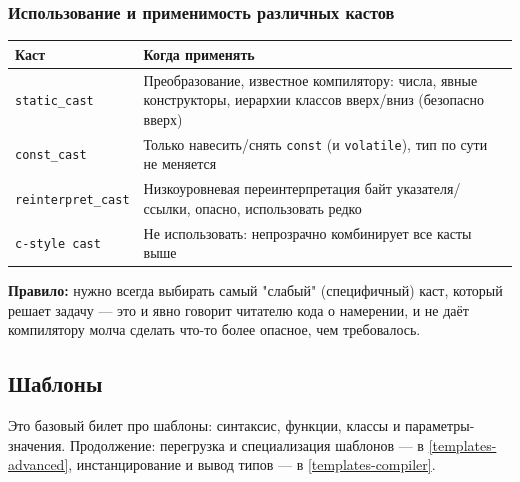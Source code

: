 \subsubsection{Использование и применимость различных кастов}
\begin{center}
\begin{tabular}{|l|l|}
\hline
\textbf{Каст} & \textbf{Когда применять} \\
\hline
\texttt{static\_cast} & Преобразование, известное компилятору: числа, явные конструкторы, иерархии классов вверх/вниз (безопасно вверх) \\
\hline
\texttt{const\_cast} & Только навесить/снять \texttt{const} (и \texttt{volatile}), тип по сути не меняется \\
\hline
\texttt{reinterpret\_cast} & Низкоуровневая переинтерпретация байт указателя/ссылки, опасно, использовать редко \\
\hline
\texttt{c-style cast} & Не использовать: непрозрачно комбинирует все касты выше \\
\hline
\end{tabular}
\end{center}
\textbf{Правило:} нужно всегда выбирать самый "слабый" (специфичный) каст, который решает задачу --- это и явно говорит читателю кода о намерении, и не даёт компилятору молча сделать что-то более опасное, чем требовалось.

\subsection{Шаблоны} \label{templates-basic}
Это базовый билет про шаблоны: синтаксис, функции, классы и параметры-значения. Продолжение: перегрузка и специализация шаблонов --- в \ref{templates-advanced}, инстанцирование и вывод типов --- в \ref{templates-compiler}.
